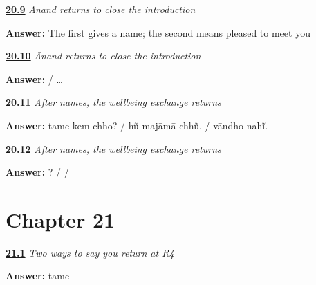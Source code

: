 \noindent\begin{minipage}[t]{\linewidth}
\raggedright
\hyperlink{review-GU-R16-anand-r4-listening}{\textbf{20.9}} \emph{Ānand returns to close the introduction}\par
\small \textbf{Answer:} The first gives a name; the second means pleased to meet you\par
\end{minipage}\par\medskip

\noindent\begin{minipage}[t]{\linewidth}
\raggedright
\hyperlink{review-GU-R16-anand-r4-writing}{\textbf{20.10}} \emph{Ānand returns to close the introduction}\par
\small \textbf{Answer:}  /   … \par
\end{minipage}\par\medskip

\noindent\begin{minipage}[t]{\linewidth}
\raggedright
\hyperlink{review-GU-R16-wellbeing-r3-listening}{\textbf{20.11}} \emph{After names, the wellbeing exchange returns}\par
\small \textbf{Answer:} tame kem chho? / hũ majāmā chhũ. / vāndho nahĩ.\par
\end{minipage}\par\medskip

\noindent\begin{minipage}[t]{\linewidth}
\raggedright
\hyperlink{review-GU-R16-wellbeing-r3-writing}{\textbf{20.12}} \emph{After names, the wellbeing exchange returns}\par
\small \textbf{Answer:}   ? /    /  \par
\end{minipage}\par\medskip

\section*{Chapter 21}

\noindent\begin{minipage}[t]{\linewidth}
\raggedright
\hyperlink{review-GU-R17-you-r4-listening}{\textbf{21.1}} \emph{Two ways to say you return at R4}\par
\small \textbf{Answer:} tame\par
\end{minipage}\par\medskip

